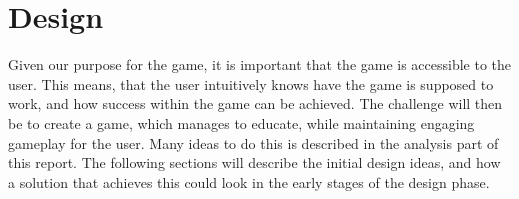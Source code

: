 \chapter{Design}
\label{cha:design}

Given our purpose for the game, it is important that the game is accessible to the user.
This means, that the user intuitively knows have the game is supposed to work, and how success within the game can be achieved.
The challenge will then be to create a game, which manages to educate, while maintaining engaging gameplay for the user.
Many ideas to do this is described in the analysis part of this report.
The following sections will describe the initial design ideas, and how a solution that achieves this could look in the early stages of the design phase.





